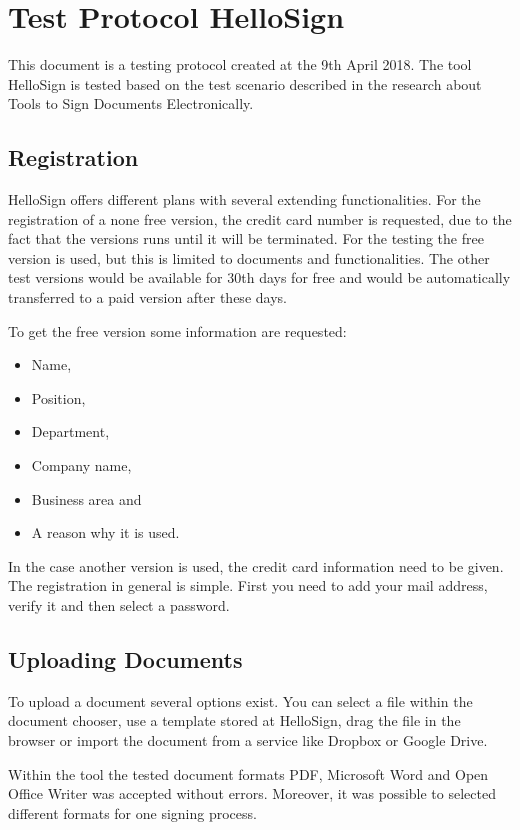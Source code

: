 \section{Test Protocol HelloSign} \label{tool:sec:hellosign}
This document is a testing protocol created at the 9th April 2018. The tool HelloSign is tested based on the test scenario described in the research about Tools to Sign Documents Electronically.

\subsection{Registration}
HelloSign offers different plans with several extending functionalities. For the registration of a none free version, the credit card number is requested, due to the fact that the versions runs until it will be terminated. For the testing the free version is used, but this is limited to documents and functionalities. The other test versions would be available for 30th days for free and would be automatically transferred to a paid version after these days.

To get the free version some information are requested:
\begin{itemize}
	\item Name,
	\item Position,
	\item Department,
	\item Company name,
	\item Business area and
	\item A reason why it is used.
\end{itemize}
In the case another version is used, the credit card information need to be given. \newline
The registration in general is simple. First you need to add your mail address, verify it and then select a password.

\subsection{Uploading Documents}
To upload a document several options exist. You can select a file within the document chooser, use a template stored at HelloSign, drag the file in the browser or import the document from a service like Dropbox or Google Drive.

Within the tool the tested document formats \gls{PDF}, Microsoft Word and Open Office Writer was accepted without errors. Moreover, it was possible to selected different formats for one signing process.

